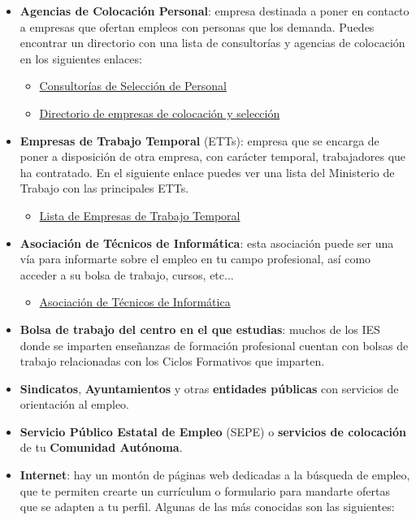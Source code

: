\begin{itemize}
    \item \textbf{Agencias de Colocación Personal}: empresa destinada a poner en contacto a empresas que ofertan empleos con personas que los demanda. Puedes encontrar un directorio con una lista de consultorías y agencias de colocación en los siguientes enlaces:
    \begin{itemize}
        \item \href{https://www.infojobs.net/#seccion3}{Consultorías de Selección de Personal}
        \item \href{https://www.informacion-empresas.com/745_SELECCION-COLOCACION-PERSONAL.html}{Directorio de empresas de colocación y selección}
    \end{itemize}
    \item \textbf{Empresas de Trabajo Temporal} (ETTs): empresa que se encarga de poner a disposición de otra empresa, con carácter temporal, trabajadores que ha contratado. En el siguiente enlace puedes ver una lista del Ministerio de Trabajo con las principales ETTs.
    \begin{itemize}
        \item \href{https://expinterweb.mites.gob.es/sigett/consultaPublicaETT}{Lista de Empresas de Trabajo Temporal}
    \end{itemize}
    \item \textbf{Asociación de Técnicos de Informática}: esta asociación puede ser una vía para informarte sobre el empleo en tu campo profesional, así como acceder a su bolsa de trabajo, cursos, etc...
    \begin{itemize}
        \item \href{https://www.ati.es/}{Asociación de Técnicos de Informática}
    \end{itemize}
    \item \textbf{Bolsa de trabajo del centro en el que estudias}: muchos de los IES donde se imparten enseñanzas de formación profesional cuentan con bolsas de trabajo relacionadas con los Ciclos Formativos que imparten.
    \item \textbf{Sindicatos}, \textbf{Ayuntamientos} y otras \textbf{entidades públicas} con servicios de orientación al empleo.
    \item \textbf{Servicio Público Estatal de Empleo} (SEPE) o \textbf{servicios de colocación} de tu \textbf{Comunidad Autónoma}.
    \item \textbf{Internet}: hay un montón de páginas web dedicadas a la búsqueda de empleo, que te permiten crearte un currículum o formulario para mandarte ofertas que se adapten a tu perfil. Algunas de las más conocidas son las siguientes:

\end{itemize}
